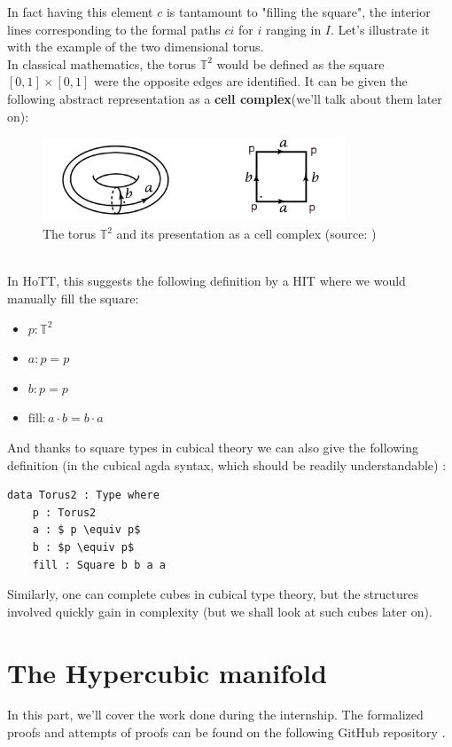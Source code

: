 \documentclass{report}
\begin{document}
In fact having this element $c$ is tantamount to "filling the square", the interior lines corresponding to the formal paths $c i$ for $i$ ranging in $I$. Let's illustrate it with the example of the two dimensional torus.\\ 
In classical mathematics, the torus $\mathbb{T}^2$ would be defined as the square $[0,1]\times[0,1]$ were the opposite edges are identified. It can be given the following abstract representation as a \textbf{cell complex}(we'll talk about them  later on):
\begin{figure}[h]
  \begin{center}
    \includegraphics[height= 2.5cm]{torus.png}
    \caption{The torus $\mathbb{T}^2$ and its presentation as a cell complex (source: \cite{hatcher})}
    \label{fig:torus}
  \end{center}
\end{figure}
\\
In HoTT, this suggests the following definition by a HIT where we would manually fill the square:
\begin{itemize}
  \item $ p : \mathbb{T}^2$
  \item $a : p = p$
  \item $b : p = p $
  \item $\mathrm{fill} :  a \cdot b = b \cdot a$
\end{itemize}
And thanks to square types in cubical theory we can also give the following definition (in the cubical agda syntax, which should be readily understandable) : 
\begin{lstlisting}[mathescape=true]
    data Torus2 : Type where
    p : Torus2
    a : $ p \equiv p$
    b : $p \equiv p$
    fill : Square b b a a
\end{lstlisting}
Similarly, one can complete cubes in cubical type theory, but the structures involved quickly gain in complexity (but we shall look at such cubes later on).
\chapter{The Hypercubic manifold} 
In this part, we'll cover the work done during the internship. The formalized proofs and attempts of proofs can be found on the following GitHub repository \cite{repo}.
\end{document}

